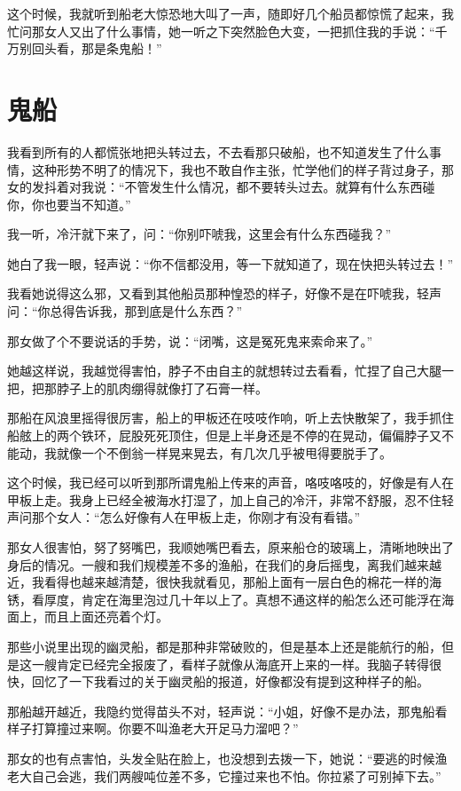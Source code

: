 这个时候，我就听到船老大惊恐地大叫了一声，随即好几个船员都惊慌了起来，我忙问那女人又出了什么事情，她一听之下突然脸色大变，一把抓住我的手说：“千万别回头看，那是条鬼船！”

\chapter{鬼船}

我看到所有的人都慌张地把头转过去，不去看那只破船，也不知道发生了什么事情，这种形势不明了的情况下，我也不敢自作主张，忙学他们的样子背过身子，那女的发抖着对我说：“不管发生什么情况，都不要转头过去。就算有什么东西碰你，你也要当不知道。”

我一听，冷汗就下来了，问：“你别吓唬我，这里会有什么东西碰我？”

她白了我一眼，轻声说：“你不信都没用，等一下就知道了，现在快把头转过去！”

我看她说得这么邪，又看到其他船员那种惶恐的样子，好像不是在吓唬我，轻声问：“你总得告诉我，那到底是什么东西？”

那女做了个不要说话的手势，说：“闭嘴，这是冤死鬼来索命来了。”

她越这样说，我越觉得害怕，脖子不由自主的就想转过去看看，忙捏了自己大腿一把，把那脖子上的肌肉绷得就像打了石膏一样。

那船在风浪里摇得很厉害，船上的甲板还在吱吱作响，听上去快散架了，我手抓住船舷上的两个铁环，屁股死死顶住，但是上半身还是不停的在晃动，偏偏脖子又不能动，我就像一个不倒翁一样晃来晃去，有几次几乎被甩得要脱手了。

这个时候，我已经可以听到那所谓鬼船上传来的声音，咯吱咯吱的，好像是有人在甲板上走。我身上已经全被海水打湿了，加上自己的冷汗，非常不舒服，忍不住轻声问那个女人：“怎么好像有人在甲板上走，你刚才有没有看错。”

那女人很害怕，努了努嘴巴，我顺她嘴巴看去，原来船仓的玻璃上，清晰地映出了身后的情况。一艘和我们规模差不多的渔船，在我们的身后摇曳，离我们越来越近，我看得也越来越清楚，很快我就看见，那船上面有一层白色的棉花一样的海锈，看厚度，肯定在海里泡过几十年以上了。真想不通这样的船怎么还可能浮在海面上，而且上面还亮着个灯。

那些小说里出现的幽灵船，都是那种非常破败的，但是基本上还是能航行的船，但是这一艘肯定已经完全报废了，看样子就像从海底开上来的一样。我脑子转得很快，回忆了一下我看过的关于幽灵船的报道，好像都没有提到这种样子的船。

那船越开越近，我隐约觉得苗头不对，轻声说：“小姐，好像不是办法，那鬼船看样子打算撞过来啊。你要不叫渔老大开足马力溜吧？”

那女的也有点害怕，头发全贴在脸上，也没想到去拨一下，她说：“要逃的时候渔老大自己会逃，我们两艘吨位差不多，它撞过来也不怕。你拉紧了可别掉下去。”

